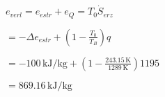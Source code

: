 \( e_{verl} = e_{estr} + e_{Q} = T_0 \dot{S}_{erz} \)  

\( = - \Delta e_{estr} + \left( 1 - \frac{T_0}{T_B} \right) q \)  

\( = -100 \, \text{kJ/kg} + \left( 1 - \frac{243.15 \, \text{K}}{1289 \, \text{K}} \right) 1195 \)  

\( = 869.16 \, \text{kJ/kg} \)